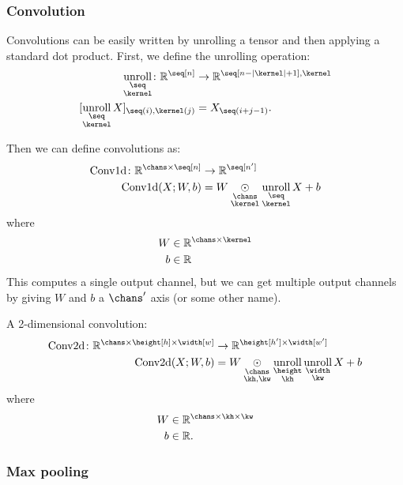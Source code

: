 \documentclass{article}
\newcommand{\reals}{\mathbb{R}}
\begin{document}
\subsubsection{Convolution}

Convolutions can be easily written by unrolling a tensor and then
applying a standard dot product. First, we define the unrolling operation:
\begin{align*}
  \nfun{\seq \\ \kernel}{unroll} \colon \reals^{\seq[n]} &\rightarrow \reals^{\seq[n-|\kernel|+1], \kernel} \\
  [\nfun{\seq \\ \kernel}{unroll} X]_{\seq(i), \kernel(j)} &= X_{\seq(i+j - 1)}.
\end{align*}

Then we can define convolutions as:
\begin{align*}
\text{Conv1d} \colon \reals^{\chans \times \seq[n]} &\rightarrow \mathbb{R}^{\seq[n']} \\
\text{Conv1d}(X; W, b) &= W \ndot{\chans \\ \kernel} \nfun{\seq \\ \kernel}{unroll} X + b
\end{align*}
where
\begin{align*}
W &\in \reals^{\chans \times \kernel} \\
b &\in \reals \\
\end{align*}
This computes a single output channel, but we can get multiple output channels by giving $W$ and $b$ a $\chans'$ axis (or some other name).

A 2-dimensional convolution:
\begin{align*}
  \text{Conv2d} \colon \reals^{\chans \times \height[h] \times \width[w]}
  &\rightarrow \reals^{\height[h'] \times \width[w']} \\
  \text{Conv2d}(X; W, b) &= W \ndot{\chans \\ \kh, \kw} \nfun{\height \\ \kh}{unroll} \nfun{\width\\\kw}{unroll} X + b
\end{align*}  
where
\begin{align*}
W &\in \reals^{\chans \times \kh \times \kw} \\
b &\in \reals.
\end{align*}

\subsubsection{Max pooling}
\end{document}
